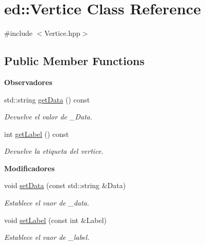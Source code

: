 \hypertarget{classed_1_1Vertice}{}\section{ed\+:\+:Vertice Class Reference}
\label{classed_1_1Vertice}


{\ttfamily \#include $<$Vertice.\+hpp$>$}

\subsection*{Public Member Functions}
\begin{Indent}{\bf Observadores}\par
\begin{DoxyCompactItemize}
\item 
std\+::string \hyperlink{classed_1_1Vertice_acee0e9f23c432112f0a8c620c3a4212d}{get\+Data} () const 
\begin{DoxyCompactList}\small\item\em Devuelve el valor de \+\_\+\+Data. \end{DoxyCompactList}\item 
int \hyperlink{classed_1_1Vertice_a4e33ff0ffcd7b71ad53a04fb9284ffd7}{get\+Label} () const 
\begin{DoxyCompactList}\small\item\em Devuelve la etiqueta del vertice. \end{DoxyCompactList}\end{DoxyCompactItemize}
\end{Indent}
\begin{Indent}{\bf Modificadores}\par
\begin{DoxyCompactItemize}
\item 
void \hyperlink{classed_1_1Vertice_a6aa6f45cd974f343df76bf5ce1bbab58}{set\+Data} (const std\+::string \&Data)
\begin{DoxyCompactList}\small\item\em Establece el vaor de \+\_\+data. \end{DoxyCompactList}\item 
void \hyperlink{classed_1_1Vertice_ae92311a64639de2dcb89f719852904be}{set\+Label} (const int \&Label)
\begin{DoxyCompactList}\small\item\em Establece el vaor de \+\_\+label. \end{DoxyCompactList}\end{DoxyCompactItemize}
\end{Indent}


